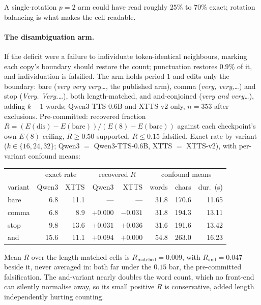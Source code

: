 \noindent A single-rotation $p{=}2$ arm could have read roughly $25\%$
to $70\%$ exact; rotation balancing is what makes the cell readable.

\paragraph{The disambiguation arm.} If the deficit were a failure to
individuate token-identical neighbours, marking each copy's boundary
should restore the count; punctuation restores $0.9\%$ of it, and
individuation is falsified. The arm holds period $1$ and edits only
the boundary: bare (\emph{very very very\ldots}, the published arm),
comma (\emph{very, very,\ldots}) and stop (\emph{Very. Very.\ldots}),
both length-matched, and and-conjoined (\emph{very and very\ldots}),
adding $k-1$ words; Qwen3-TTS-0.6B and XTTS-v2 only, $n=353$ after
exclusions. Pre-committed: recovered fraction
$R=(E(\text{dis})-E(\text{bare}))/(E(8)-E(\text{bare}))$ against each
checkpoint's own $E(8)$ ceiling, $R\ge0.50$ supported, $R\le0.15$
falsified. Exact rate by variant ($k\in\{16,24,32\}$; Qwen3 $=$
Qwen3-TTS-0.6B, XTTS $=$ XTTS-v2), with per-variant confound means:

\begin{center}
\begin{tabular}{@{}lrrrrrrr@{}}
\toprule
 & \multicolumn{2}{c}{exact rate} & \multicolumn{2}{c}{recovered $R$} & \multicolumn{3}{c}{confound means} \\
variant & Qwen3 & XTTS & Qwen3 & XTTS & words & chars & dur.\ (s) \\
\midrule
bare  &  6.8 & 11.1 & ---      & ---      & 31.8 & 170.6 & 11.65 \\
comma &  6.8 &  8.9 & $+0.000$ & $-0.031$ & 31.8 & 194.3 & 13.11 \\
stop  &  9.8 & 13.6 & $+0.031$ & $+0.036$ & 31.6 & 191.6 & 13.42 \\
and   & 15.6 & 11.1 & $+0.094$ & $+0.000$ & 54.8 & 263.0 & 16.23 \\
\bottomrule
\end{tabular}
\end{center}

\noindent Mean $R$ over the length-matched cells is
$R_{\text{matched}}=0.009$, with $R_{\text{and}}=0.047$ beside it,
never averaged in: both far under the $0.15$ bar, the pre-committed
falsification. The and-variant nearly doubles the word count, which no
front-end can silently normalise away, so its small positive $R$ is
conservative, added length independently hurting counting.


